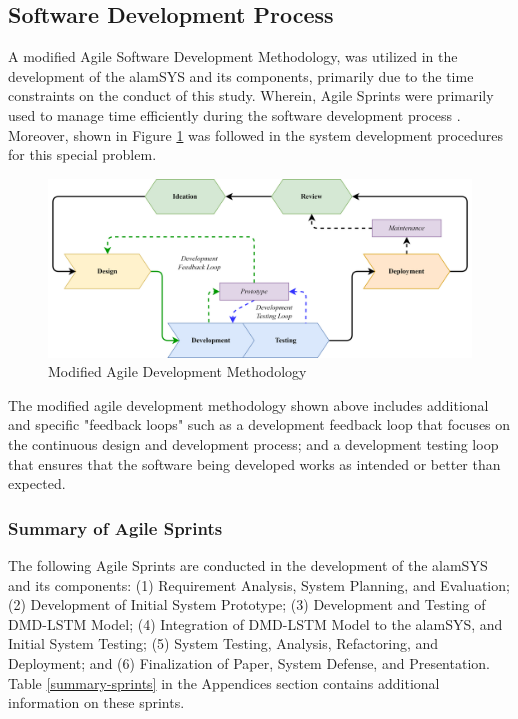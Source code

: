 \subsection{Software Development Process}
\label{subsec:soft_dev}
A modified Agile Software Development Methodology, was utilized in the development
of the alamSYS and its components, primarily due to the time constraints
on the conduct of this study. Wherein, Agile Sprints were primarily used to manage 
time efficiently during the software development process
\cite{JavaTPointAgile, Milne2021}. Moreover, shown in Figure \ref{fig:agile} was followed 
in the system development procedures for this special problem.

\begin{figure}[ht]
    \centering
    \includegraphics[width=1\textwidth]{./assets/Chapter_3/agile.png}
    \caption{Modified Agile Development Methodology}
    \label{fig:agile}
\end{figure}
\FloatBarrier

The modified agile development methodology shown above includes 
additional and specific "feedback loops" such as a development 
feedback loop that focuses on the continuous design and development 
process; and a development testing loop that ensures that the 
software being developed works as intended or better than expected.

\subsubsection{Summary of Agile Sprints}
\label{subsubsec:summ_sprints}
The following Agile Sprints are conducted in the development of the alamSYS and its components: 
(1) Requirement Analysis, System Planning, and Evaluation; (2) Development of Initial System Prototype; 
(3) Development and Testing of DMD-LSTM Model; (4) Integration of DMD-LSTM Model to the alamSYS, 
and Initial System Testing; (5) System Testing, Analysis, Refactoring, and Deployment; and 
(6) Finalization of Paper, System Defense, and Presentation. Table \ref{summary-sprints} in the Appendices section 
contains additional information on these sprints.